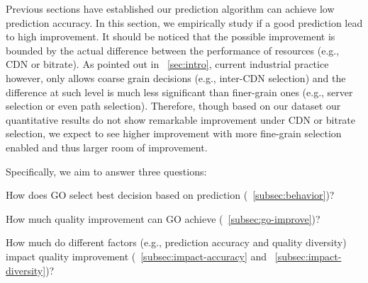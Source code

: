 \label{sec:improvement}

Previous sections have established our prediction algorithm can achieve low prediction accuracy. In this section, we empirically study if a good prediction lead to high improvement. It should be noticed that the possible improvement is bounded by the actual difference between the performance of resources (e.g., CDN or bitrate). As pointed out in \Section~\ref{sec:intro}, current industrial practice however, only allows coarse grain decisions (e.g., inter-CDN selection) and the difference at such level is much less significant than finer-grain ones (e.g., server selection or even path selection). Therefore, though based on our dataset our quantitative results do not show remarkable improvement under CDN or bitrate selection, we expect to see higher improvement with more fine-grain selection enabled and thus larger room of improvement.

Specifically, we aim to answer three questions:
\begin{packedenumerate}
	\item How does GO select best decision based on prediction (\Section~\ref{subsec:behavior})?
	\item How much quality improvement can GO achieve (\Section~\ref{subsec:go-improve})?
	\item How much do different factors (e.g., prediction accuracy and quality diversity) impact quality improvement (\Section~\ref{subsec:impact-accuracy} and ~\ref{subsec:impact-diversity})?
\end{packedenumerate}

